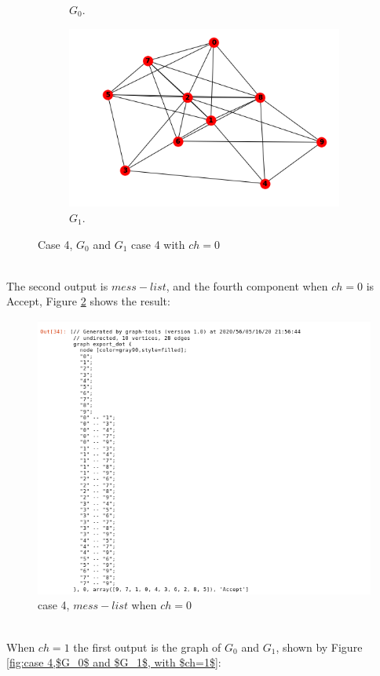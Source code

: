 \documentclass[12pt,a4paper]{article}
\begin{document}
\begin{itemize}
\begin{figure}[h!]
\begin{subfigure}[b]{.45\linewidth}
		\caption{$G_0$.}
	\end{subfigure}
	\begin{subfigure}[b]{.45\linewidth}
		\includegraphics[width=\linewidth]{3-24.png}
		\caption{$G_1$.}
	\end{subfigure}
	\caption{ Case 4, $G_0$ and $G_1$ case 4 with $ch=0$}
	\label{fig: case 4, $G_0$ and $G_1$, with $ch=0$}
\end{figure}\\
The second output is $mess-list$, and the fourth component when $ch=0$ is Accept, Figure \ref{fig:3-25} shows the result:
\begin{figure}[h]
	\centering
	\includegraphics[width=0.7\linewidth]{3-25}
	\caption{case 4, $mess-list$ when $ch=0$}
	\label{fig:3-25}
\end{figure}\\
When $ch=1$ the first output is the graph of $G_0$ and $G_1$, shown by Figure \ref{fig:case 4,$G_0$ and $G_1$, with $ch=1$}:\\

\end{itemize}
\end{document}
